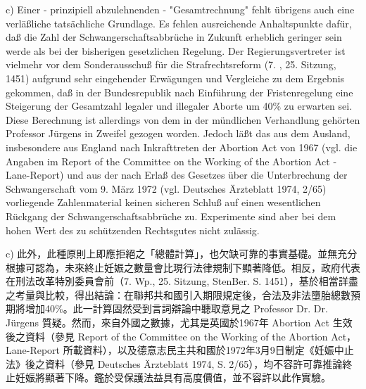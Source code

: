 \documentclass[12pt]{article}
\begin{document}
\syncleft
\begin{sourcepara}
c) Einer - prinzipiell abzulehnenden - "Gesamtrechnung" fehlt übrigens auch eine verläßliche tatsächliche Grundlage. Es fehlen ausreichende Anhaltspunkte dafür, daß die Zahl der Schwangerschaftsabbrüche in Zukunft erheblich geringer sein werde als bei der bisherigen gesetzlichen Regelung. Der Regierungsvertreter ist vielmehr vor dem Sonderausschuß für die Strafrechtsreform (7. \abbrWp{}, 25. Sitzung, \abbrStenBer{} \abbrS{} 1451) aufgrund sehr eingehender Erwägungen und Vergleiche zu dem Ergebnis gekommen, daß in der Bundesrepublik nach Einführung der Fristenregelung eine Steigerung der Gesamtzahl legaler und illegaler Aborte um 40\% zu erwarten sei. Diese Berechnung ist allerdings von dem in der mündlichen Verhandlung gehörten Professor \abbrDr{}\abbrDr{} Jürgens in Zweifel gezogen worden. Jedoch läßt das aus dem Ausland, insbesondere aus England nach Inkrafttreten der Abortion Act von 1967 (vgl. die Angaben im Report of the Committee on the Working of the Abortion Act - Lane-Report) und aus der \abbrDDR{} nach Erlaß des Gesetzes über die Unterbrechung der Schwangerschaft vom 9. März 1972 (vgl. Deutsches Ärzteblatt 1974, \abbrS{} 2/65) vorliegende Zahlenmaterial keinen sicheren Schluß auf einen wesentlichen Rückgang der Schwangerschaftsabbrüche zu. Experimente sind aber bei dem hohen Wert des zu schützenden Rechtsgutes nicht zulässig.
\end{sourcepara}
\begin{transpara}
c) 此外，此種原則上即應拒絕之「總體計算」，也欠缺可靠的事實基礎。並無充分根據可認為，未來終止妊娠之數量會比現行法律規制下顯著降低。相反，政府代表在刑法改革特別委員會前（7. Wp., 25. Sitzung, StenBer. S. 1451），基於相當詳盡之考量與比較，得出結論：在聯邦共和國引入期限規定後，合法及非法墮胎總數預期將增加40\%。此一計算固然受到言詞辯論中聽取意見之 Professor Dr. Dr. Jürgens 質疑。然而，來自外國之數據，尤其是英國於1967年 Abortion Act 生效後之資料（參見 Report of the Committee on the Working of the Abortion Act，Lane-Report 所載資料），以及德意志民主共和國於1972年3月9日制定《妊娠中止法》後之資料（參見 Deutsches Ärzteblatt 1974, S. 2/65），均不容許可靠推論終止妊娠將顯著下降。鑑於受保護法益具有高度價值，並不容許以此作實驗。
\end{transpara}
\end{document}
